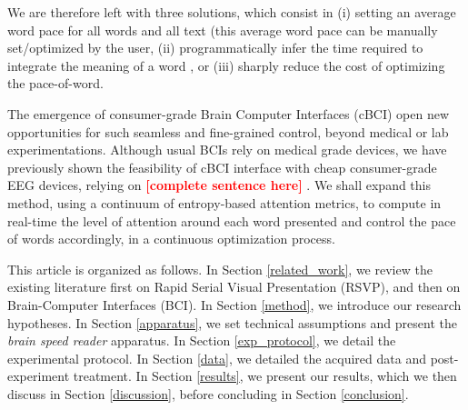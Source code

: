 We are therefore left with three solutions, which consist in (i) setting an average word pace for all words and all text (this average word pace can be manually set/optimized by the user, (ii) programmatically infer the time required to integrate the meaning of a word \cite{smith2013effect}, or (iii) sharply reduce the cost of optimizing the pace-of-word.

The emergence of consumer-grade Brain Computer Interfaces (cBCI) open new opportunities for such seamless and fine-grained control, beyond medical or lab experimentations. Although usual BCIs rely on medical grade devices, we have previously shown the feasibility of cBCI interface with cheap consumer-grade EEG devices, relying on \textcolor{red}{\bf [complete sentence here]} \cite{}. We shall expand this method, using a continuum of entropy-based attention metrics, to compute in real-time the level of attention around each word presented and control the pace of words accordingly, in a continuous optimization process.

This article is organized as follows. In Section \ref{related_work}, we review the existing literature first on Rapid Serial Visual Presentation (RSVP), and then on Brain-Computer Interfaces (BCI). In Section \ref{method}, we introduce our research hypotheses. In Section \ref{apparatus}, we set technical assumptions and present the {\it brain speed reader} apparatus. In Section \ref{exp_protocol}, we detail the experimental protocol. In Section \ref{data}, we detailed the acquired data and post-experiment treatment. In Section \ref{results}, we present our results, which we then discuss in Section \ref{discussion}, before concluding in Section \ref{conclusion}.


